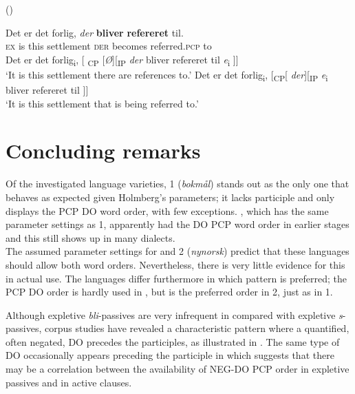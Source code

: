 \documentclass[output=paper]{LSP/langsci}
\begin{document}
\ea%
    \label{ex:engdahl:28}
     (\citealt[314]{EngdahlLaanemets2015prepositional})
    \ea\label{ex:engdahl:28a}
    
\gll  Det er   det   forlig,    \textit{der}   \textbf{bliver}  \textbf{refereret} til. \\
   \textsc{ex}  is  this   settlement \textsc{der}  becomes    referred\textsc{.pcp}  to\\
\ex\label{ex:engdahl:28b}
     Det er det forlig\textsubscript{i},  [ \textsubscript{CP} [\textit{Ø}][\textsubscript{IP} \textit{der} bliver refereret til \textit{e}\textsubscript{i} ]]\\
\glt ‘It is this settlement there are references to.’
\ex\label{ex:engdahl:28c}
 Det er det forlig\textsubscript{i},  [\textsubscript{CP}[ \textit{der}][\textsubscript{IP} \textit{e}\textsubscript{i} bliver refereret til ]]\\
\glt ‘It is this settlement that is being referred to.’
\z
\z

\section{Concluding remarks} %

Of the investigated language varieties,  1 (\textit{bokmål}) stands out as the only one that behaves as expected given Holmberg’s parameters; it lacks participle  and only displays the PCP DO word order, with few exceptions. , which has the same parameter settings as  1, apparently had the DO PCP word order in earlier stages and this still shows up in many dialects.  \\
The assumed parameter settings for  and  2 (\textit{nynorsk}) predict that these languages should allow both word orders. Nevertheless, there is very little evidence for this in actual use. The languages differ furthermore in which pattern is preferred; the PCP DO order is hardly used in , but is the preferred order in  2, just as in  1.   

Although expletive \textit{bli}{}-passives are very infrequent in  compared with expletive \textit{s}{}-passives, corpus studies have revealed a characteristic pattern where a quantified, often negated, DO precedes the participles, as illustrated in . The same type of DO occasionally appears preceding the participle in  which suggests that there may be a correlation between the availability of NEG-DO PCP order in expletive passives and in active clauses.
\end{document}
